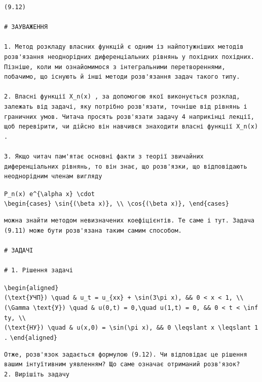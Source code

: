 \documentclass[
  ukrainian,
]{article}
\begin{document}
\begin{verbatim}
(9.12)

# ЗАУВАЖЕННЯ

1. Метод розкладу власних функцій є одним із найпотужніших методів розв'язання неоднорідних диференціальних рівнянь у похідних похідних. Пізніше, коли ми ознайомимося з інтегральними перетвореннями, побачимо, що існують й інші методи розв'язання задач такого типу.

2. Власні функції X_n(x) , за допомогою якої виконується розклад, залежать від задачі, яку потрібно розв'язати, точніше від рівнянь і граничних умов. Читача просять розв'язати задачу 4 наприкінці лекції, щоб перевірити, чи дійсно він навчився знаходити власні функції X_n(x) .

3. Якщо читач пам'ятає основні факти з теорії звичайних диференціальних рівнянь, то він знає, що розв'язки, що відповідають неоднорідним членам вигляду
\end{verbatim}

\texttt{P\_n(x)\ e\^{}\{\textbackslash{}alpha\ x\}\ \textbackslash{}cdot}
\texttt{\textbackslash{}begin\{cases\}\ \textbackslash{}sin\{(\textbackslash{}beta\ x)\},\ \textbackslash{}\textbackslash{}\ \textbackslash{}cos\{(\textbackslash{}beta\ x)\},\ \textbackslash{}end\{cases\}}

\begin{verbatim}
можна знайти методом невизначених коефіцієнтів. Те саме і тут. Задача (9.11) може бути розв'язана таким самим способом.

# ЗАДАЧІ

# 1. Рішення задачі
\end{verbatim}

\texttt{\textbackslash{}begin\{aligned\}}
\texttt{(\textbackslash{}text\{УЧП\})\ \textbackslash{}quad\ \&\ u\_t\ =\ u\_\{xx\}\ +\ \textbackslash{}sin(3\textbackslash{}pi\ x),\ \&\&\ 0\ \textless{}\ x\ \textless{}\ 1,\ \textbackslash{}\textbackslash{}}
\texttt{(\textbackslash{}Gamma\ \textbackslash{}text\{У\})\ \textbackslash{}quad\ \&\ u(0,t)\ =\ 0,\textbackslash{}quad\ u(1,t)\ =\ 0,\ \&\&\ 0\ \textless{}\ t\ \textless{}\ \textbackslash{}infty,\ \textbackslash{}\textbackslash{}}
\texttt{(\textbackslash{}text\{НУ\})\ \textbackslash{}quad\ \&\ u(x,0)\ =\ \textbackslash{}sin(\textbackslash{}pi\ x),\ \&\&\ 0\ \textbackslash{}leqslant\ x\ \textbackslash{}leqslant\ 1.}
\texttt{\textbackslash{}end\{aligned\}}

\begin{verbatim}
Отже, розв'язок задається формулою (9.12). Чи відповідає це рішення вашим інтуїтивним уявленням? Що саме означає отриманий розв'язок?
2. Вирішіть задачу
\end{verbatim}
\end{document}
